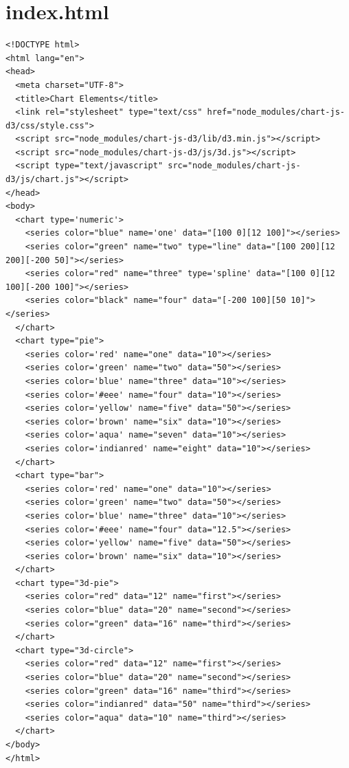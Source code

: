 \documentclass[a4paper,14pt]{extreport}
\begin{document}
\section*{index.html}
\begin{lstlisting}
<!DOCTYPE html>
<html lang="en">
<head>
  <meta charset="UTF-8">
  <title>Chart Elements</title>
  <link rel="stylesheet" type="text/css" href="node_modules/chart-js-d3/css/style.css">
  <script src="node_modules/chart-js-d3/lib/d3.min.js"></script>
  <script src="node_modules/chart-js-d3/js/3d.js"></script>
  <script type="text/javascript" src="node_modules/chart-js-d3/js/chart.js"></script>
</head>
<body>
  <chart type='numeric'>
    <series color="blue" name='one' data="[100 0][12 100]"></series>
    <series color="green" name="two" type="line" data="[100 200][12 200][-200 50]"></series>
    <series color="red" name="three" type='spline' data="[100 0][12 100][-200 100]"></series>
    <series color="black" name="four" data="[-200 100][50 10]"></series>
  </chart>
  <chart type="pie">
    <series color='red' name="one" data="10"></series>
    <series color='green' name="two" data="50"></series>
    <series color='blue' name="three" data="10"></series>
    <series color='#eee' name="four" data="10"></series>
    <series color='yellow' name="five" data="50"></series>
    <series color='brown' name="six" data="10"></series>
    <series color='aqua' name="seven" data="10"></series>
    <series color='indianred' name="eight" data="10"></series>
  </chart>
  <chart type="bar">
    <series color='red' name="one" data="10"></series>
    <series color='green' name="two" data="50"></series>
    <series color='blue' name="three" data="10"></series>
    <series color='#eee' name="four" data="12.5"></series>
    <series color='yellow' name="five" data="50"></series>
    <series color='brown' name="six" data="10"></series>
  </chart>
  <chart type="3d-pie">
    <series color="red" data="12" name="first"></series>
    <series color="blue" data="20" name="second"></series>
    <series color="green" data="16" name="third"></series>
  </chart>
  <chart type="3d-circle">
    <series color="red" data="12" name="first"></series>
    <series color="blue" data="20" name="second"></series>
    <series color="green" data="16" name="third"></series>
    <series color="indianred" data="50" name="third"></series>
    <series color="aqua" data="10" name="third"></series>
  </chart>
</body>
</html>
\end{lstlisting}
\end{document}
